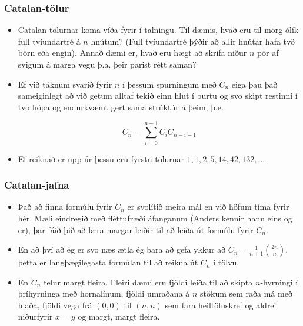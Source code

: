 \documentclass{beamer}
\begin{document}
\begin{frame}
\frametitle{Catalan-tölur}

\begin{itemize}

\item<1-> Catalan-tölurnar koma víða fyrir í talningu. Til dæmis, hvað eru til mörg ólík full tvíundartré á $n$ hnútum? (Full tvíundartré þýðir að allir hnútar hafa tvö börn eða engin). Annað dæmi er, hvað eru hægt að skrifa niður $n$ pör af svigum á marga vegu þ.a. þeir parist rétt saman?

\item<2-> Ef við táknum svarið fyrir $n$ í þessum spurningum með $C_n$ eiga þau það sameiginlegt að við getum alltaf tekið einn hlut í burtu og svo skipt restinni í tvo hópa og endurkvæmt gert sama strúktúr á þeim, þ.e.

\[C_n = \sum_{i = 0}^{n - 1} C_i C_{n - i - 1}\]

\item<3-> Ef reiknað er upp úr þessu eru fyrstu tölurnar $1, 1, 2, 5, 14, 42, 132, \dots$

\end{itemize}

\end{frame}

\begin{frame}
\frametitle{Catalan-jafna}

\begin{itemize}

\item<1-> Það að finna formúlu fyrir $C_n$ er svolítið meira mál en við höfum tíma fyrir hér. Mæli eindregið með fléttufræði áfanganum (Anders kennir hann eins og er), þar fáið þið að læra margar leiðir til að leiða út formúlu fyrir $C_n$. 

\item<2-> En að því að ég er svo næs ætla ég bara að gefa ykkur að $C_n = \frac{1}{n + 1}\binom{2n}{n}$, þetta er langþægilegasta formúlan til að reikna út $C_n$ í tölvu.

\item<3-> En $C_n$ telur margt fleira. Fleiri dæmi eru fjöldi leiða til að skipta $n$-hyrningi í þríhyrninga með hornalínum, fjöldi umraðana á $n$ stökum sem raða má með hlaða, fjöldi vega frá $(0, 0)$ til $(n, n)$ sem fara heiltöluskref og aldrei niðurfyrir $x = y$ og margt, margt fleira.

\end{itemize}

\end{frame}
\end{document}
